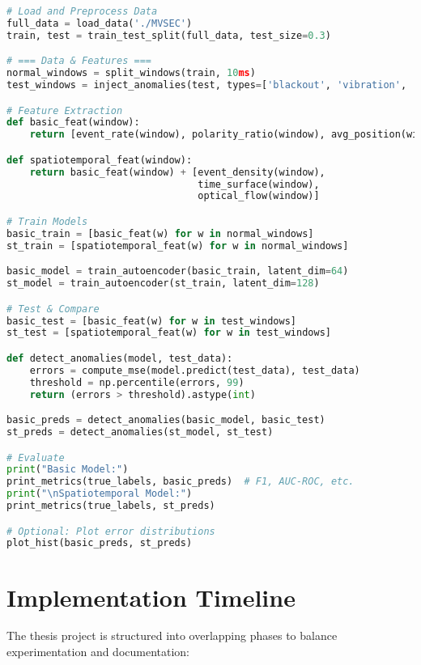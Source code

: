 \documentclass[12pt,a4paper]{article}
\begin{document}
\begin{lstlisting}[language=Python, basicstyle=\small\ttfamily, frame=single, breaklines=true]
# Load and Preprocess Data
full_data = load_data('./MVSEC')
train, test = train_test_split(full_data, test_size=0.3)

# === Data & Features ===
normal_windows = split_windows(train, 10ms)
test_windows = inject_anomalies(test, types=['blackout', 'vibration', 'flip'], ratio=50%)

# Feature Extraction
def basic_feat(window):
    return [event_rate(window), polarity_ratio(window), avg_position(window)]

def spatiotemporal_feat(window):
    return basic_feat(window) + [event_density(window), 
                                 time_surface(window), 
                                 optical_flow(window)]

# Train Models
basic_train = [basic_feat(w) for w in normal_windows]
st_train = [spatiotemporal_feat(w) for w in normal_windows]

basic_model = train_autoencoder(basic_train, latent_dim=64)
st_model = train_autoencoder(st_train, latent_dim=128)

# Test & Compare
basic_test = [basic_feat(w) for w in test_windows]
st_test = [spatiotemporal_feat(w) for w in test_windows]

def detect_anomalies(model, test_data):
    errors = compute_mse(model.predict(test_data), test_data)
    threshold = np.percentile(errors, 99)
    return (errors > threshold).astype(int)

basic_preds = detect_anomalies(basic_model, basic_test)
st_preds = detect_anomalies(st_model, st_test)

# Evaluate
print("Basic Model:")
print_metrics(true_labels, basic_preds)  # F1, AUC-ROC, etc.
print("\nSpatiotemporal Model:")
print_metrics(true_labels, st_preds)

# Optional: Plot error distributions
plot_hist(basic_preds, st_preds)
\end{lstlisting}

\section{Implementation Timeline}

The thesis project is structured into overlapping phases to balance experimentation and documentation:
\end{document}
